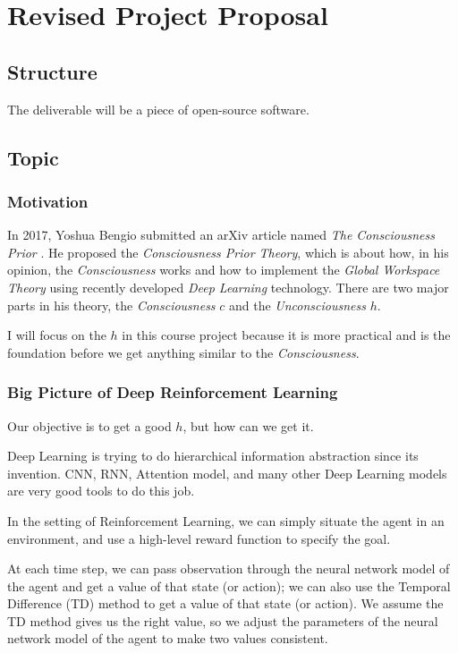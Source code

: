 



\section*{Revised Project Proposal}

\subsection*{Structure}
The deliverable will be a piece of open-source software.

\subsection*{Topic}

\subsubsection*{Motivation}
In 2017, Yoshua Bengio submitted an arXiv article named \emph{The Consciousness Prior} \cite{bengio_consciousness_2019}. 
He proposed the \emph{Consciousness Prior Theory}, which is about how, in his opinion, the \emph{Consciousness} works and how to implement the \emph{Global Workspace Theory} using recently developed \emph{Deep Learning} technology.
There are two major parts in his theory, the \emph{Consciousness} $c$ and the \emph{Unconsciousness} $h$.

I will focus on the $h$ in this course project because it is more practical and is the foundation before we get anything similar to the \emph{Consciousness}.

\subsubsection*{Big Picture of Deep Reinforcement Learning}
Our objective is to get a good $h$, but how can we get it.

Deep Learning is trying to do hierarchical information abstraction since its invention. 
CNN, RNN, Attention model, and many other Deep Learning models are very good tools to do this job.

In the setting of Reinforcement Learning, we can simply situate the agent in an environment, and use a high-level reward function to specify the goal.

At each time step, we can pass observation through the neural network model of the agent and get a value of that state (or action);
we can also use the Temporal Difference (TD) method to get a value of that state (or action).
We assume the TD method gives us the right value, so we adjust the parameters of the neural network model of the agent to make two values consistent.

